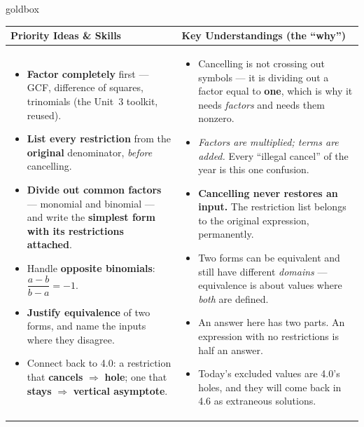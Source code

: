 \documentclass[10pt]{article}
\begin{document}
\renewcommand{\arraystretch}{1.4}
\begin{skillbox}{goldbox}
\begin{tabularx}{\linewidth}{@{}X|X@{}}
\textbf{Priority Ideas \& Skills} & \textbf{Key Understandings (the ``why'')} \\[2pt]
\hline
\vspace{-6pt}
\begin{itemize}[leftmargin=1.1em, nosep, after=\vspace{2pt}]
  \item \textbf{Factor completely} first --- GCF, difference of squares, trinomials (the Unit~3 toolkit, reused).
  \item \textbf{List every restriction} from the \textbf{original} denominator, \emph{before} cancelling.
  \item \textbf{Divide out common factors} --- monomial and binomial --- and write the \textbf{simplest form with its restrictions attached}.
  \item Handle \textbf{opposite binomials}: $\dfrac{a-b}{b-a}=-1$.
  \item \textbf{Justify equivalence} of two forms, and name the inputs where they disagree.
  \item Connect back to 4.0: a restriction that \textbf{cancels} $\Rightarrow$ \textbf{hole}; one that \textbf{stays} $\Rightarrow$ \textbf{vertical asymptote}.
\end{itemize}
&
\vspace{-6pt}
\begin{itemize}[leftmargin=1.1em, nosep, after=\vspace{2pt}]
  \item Cancelling is not crossing out symbols --- it is dividing out a factor equal to \textbf{one}, which is why it needs \emph{factors} and needs them nonzero.
  \item \emph{Factors are multiplied; terms are added.} Every ``illegal cancel'' of the year is this one confusion.
  \item \textbf{Cancelling never restores an input.} The restriction list belongs to the original expression, permanently.
  \item Two forms can be equivalent and still have different \emph{domains} --- equivalence is about values where \emph{both} are defined.
  \item An answer here has two parts. An expression with no restrictions is half an answer.
  \item Today's excluded values are 4.0's holes, and they will come back in 4.6 as extraneous solutions.
\end{itemize}
\end{tabularx}
\end{skillbox}
\end{document}

